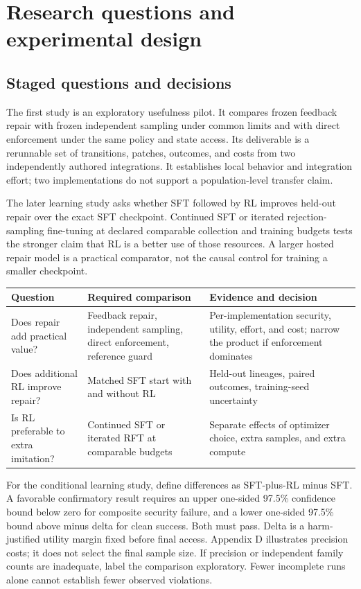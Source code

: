 \documentclass[11pt,a4paper]{article}
\begin{document}
\section{Research questions and experimental design}
\subsection{Staged questions and decisions}
The first study is an exploratory usefulness pilot. It compares frozen feedback repair with frozen independent sampling under common limits and with direct enforcement under the same policy and state access. Its deliverable is a rerunnable set of transitions, patches, outcomes, and costs from two independently authored integrations. It establishes local behavior and integration effort; two implementations do not support a population-level transfer claim.

The later learning study asks whether SFT followed by RL improves held-out repair over the exact SFT checkpoint. Continued SFT or iterated rejection-sampling fine-tuning at declared comparable collection and training budgets tests the stronger claim that RL is a better use of those resources. A larger hosted repair model is a practical comparator, not the causal control for training a smaller checkpoint.

\begingroup\small
\begin{longtable}{>{\raggedright\arraybackslash}p{}>{\raggedright\arraybackslash}p{}>{\raggedright\arraybackslash}p{}}
\toprule
\textbf{Question} & \textbf{Required comparison} & \textbf{Evidence and decision} \\
\midrule
\endhead
Does repair add practical value? & Feedback repair, independent sampling, direct enforcement, reference guard & Per-implementation security, utility, effort, and cost; narrow the product if enforcement dominates \\
Does additional RL improve repair? & Matched SFT start with and without RL & Held-out lineages, paired outcomes, training-seed uncertainty \\
Is RL preferable to extra imitation? & Continued SFT or iterated RFT at comparable budgets & Separate effects of optimizer choice, extra samples, and extra compute \\
\bottomrule
\end{longtable}
\endgroup
For the conditional learning study, define differences as SFT-plus-RL minus SFT. A favorable confirmatory result requires an upper one-sided 97.5\% confidence bound below zero for composite security failure, and a lower one-sided 97.5\% bound above minus delta for clean success. Both must pass. Delta is a harm-justified utility margin fixed before final access. Appendix D illustrates precision costs; it does not select the final sample size. If precision or independent family counts are inadequate, label the comparison exploratory. Fewer incomplete runs alone cannot establish fewer observed violations.
\end{document}
